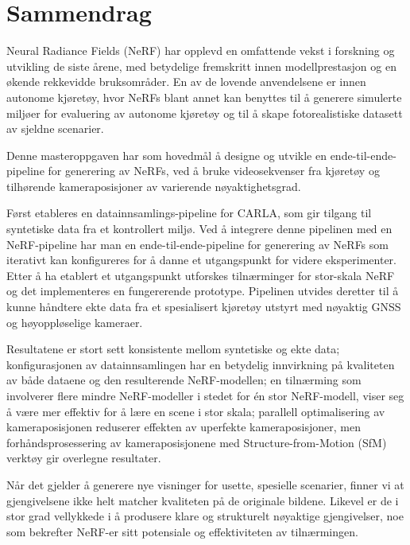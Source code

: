 \chapter*{Sammendrag}

Neural Radiance Fields (NeRF) har opplevd en omfattende vekst i forskning og utvikling de siste årene, med betydelige fremskritt innen modellprestasjon og en økende rekkevidde bruksområder. En av de lovende anvendelsene er innen autonome kjøretøy, hvor NeRFs blant annet kan benyttes til å generere simulerte miljøer for evaluering av autonome kjøretøy og til å skape fotorealistiske datasett av sjeldne scenarier.

Denne masteroppgaven har som hovedmål å designe og utvikle en ende-til-ende-pipeline for generering av NeRFs, ved å bruke videosekvenser fra kjøretøy og tilhørende kameraposisjoner av varierende nøyaktighetsgrad. 

Først etableres en datainnsamlings-pipeline for CARLA, som gir tilgang til syntetiske data fra et kontrollert miljø. Ved å integrere denne pipelinen med en NeRF-pipeline har man en ende-til-ende-pipeline for generering av NeRFs som iterativt kan konfigureres for å danne et utgangspunkt for videre eksperimenter. Etter å ha etablert et utgangspunkt utforskes tilnærminger for stor-skala NeRF og det implementeres en fungererende prototype. Pipelinen utvides deretter til å kunne håndtere ekte data fra et spesialisert kjøretøy utstyrt med nøyaktig GNSS og høyoppløselige kameraer.

Resultatene er stort sett konsistente mellom syntetiske og ekte data; konfigurasjonen av datainnsamlingen har en betydelig innvirkning på kvaliteten av både dataene og den resulterende NeRF-modellen; en tilnærming som involverer flere mindre NeRF-modeller i stedet for én stor NeRF-modell, viser seg å være mer effektiv for å lære en scene i stor skala; parallell optimalisering av kameraposisjonen reduserer effekten av uperfekte kameraposisjoner, men forhåndsprosessering av kameraposisjonene med Structure-from-Motion (SfM) verktøy gir overlegne resultater.

Når det gjelder å generere nye visninger for usette, spesielle scenarier, finner vi at gjengivelsene ikke helt matcher kvaliteten på de originale bildene. Likevel er de i stor grad vellykkede i å produsere klare og strukturelt nøyaktige gjengivelser, noe som bekrefter NeRF-er sitt potensiale og effektiviteten av tilnærmingen.



